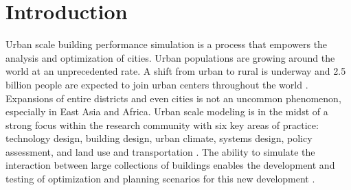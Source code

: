 \documentclass{tBPS2e}
\theoremstyle{plain}
\theoremstyle{definition}
\theoremstyle{remark}
\begin{document}


\section{Introduction}

Urban scale building performance simulation is a process that empowers the analysis and optimization of cities. Urban populations are growing around the world at an unprecedented rate. A shift from urban to rural is underway and 2.5 billion people are expected to join urban centers throughout the world \citep{UnitedNations:2014vn}. Expansions of entire districts and even cities is not an uncommon phenomenon, especially in East Asia and Africa. Urban scale modeling is in the midst of a strong focus within the research community with six key areas of practice: technology design, building design, urban climate, systems design, policy assessment, and land use and transportation \citep{Keirstead:2012ct}. The ability to simulate the interaction between large collections of buildings enables the development and testing of optimization and planning scenarios for this new development \citep{Dorer:2013vt}. 
\end{document}
